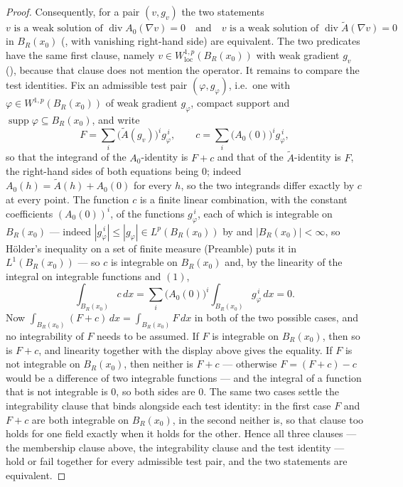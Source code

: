 \begin{proof}
Consequently, for a pair $(v,g_v)$ the two statements
\[
\text{$v$ is a weak solution of }\operatorname{div}A_0(\nabla v)=0
\quad\text{and}\quad
\text{$v$ is a weak solution of }\operatorname{div}\widetilde A(\nabla v)=0
\]
in $B_R(x_0)$ (, with vanishing right-hand side) are
equivalent.  The two predicates have the same first clause, namely
$v\in W^{1,p}_{\mathrm{loc}}(B_R(x_0))$ with weak gradient $g_v$
(), because that clause does not mention the operator.  It
remains to compare the test identities.  Fix an admissible test pair
$(\varphi,g_\varphi)$, i.e.\ one with $\varphi\in W^{1,p}(B_R(x_0))$ of weak
gradient $g_\varphi$, compact support and
$\operatorname{supp}\varphi\subseteq B_R(x_0)$, and write
\[
F=\sum_i\bigl(\widetilde A(g_v)\bigr)^ig_\varphi^{\,i},
\qquad
c=\sum_i\bigl(A_0(0)\bigr)^ig_\varphi^{\,i},
\]
so that the integrand of the $A_0$-identity is $F+c$ and that of the
$\widetilde A$-identity is $F$, the right-hand sides of both equations being
$0$; indeed $A_0(h)=\widetilde A(h)+A_0(0)$ for every $h$, so the two
integrands differ exactly by $c$ at every point.  The function $c$ is a finite
linear combination, with the constant coefficients $(A_0(0))^i$, of the
functions $g_\varphi^{\,i}$, each of which is integrable on $B_R(x_0)$ ---
indeed $|g_\varphi^{\,i}|\le|g_\varphi|\in L^p(B_R(x_0))$ by
 and $|B_R(x_0)|<\infty$, so H\"older's inequality on a set
of finite measure (Preamble) puts it in $L^1(B_R(x_0))$ --- so $c$ is
integrable on $B_R(x_0)$ and, by the linearity of the integral on integrable
functions and $(1)$,
\[
\int_{B_R(x_0)}c\,dx=\sum_i\bigl(A_0(0)\bigr)^i\int_{B_R(x_0)}g_\varphi^{\,i}\,dx=0 .
\]
Now $\int_{B_R(x_0)}(F+c)\,dx=\int_{B_R(x_0)}F\,dx$ in both of the two
possible cases, and no integrability of $F$ needs to be assumed.  If $F$ is
integrable on $B_R(x_0)$, then so is $F+c$, and linearity together with the
display above gives the equality.  If $F$ is not integrable on $B_R(x_0)$,
then neither is $F+c$ --- otherwise $F=(F+c)-c$ would be a difference of two
integrable functions --- and the integral of a function that is not integrable
is $0$, so both sides are $0$.  The same two cases settle the integrability
clause that  binds alongside each test identity: in
the first case $F$ and $F+c$ are both integrable on $B_R(x_0)$, in the second
neither is, so that clause too holds for one field exactly when it holds for the
other.  Hence all three clauses --- the membership clause above, the
integrability clause and the test identity --- hold or fail together for every
admissible test pair, and the two statements are equivalent.


\end{proof}

